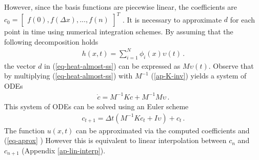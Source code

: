 However, since the basis functions are piecewise linear, the coefficients are \(c_0 = \begin{bmatrix}
f(0), f(\Delta x), ..., f(n)
\end{bmatrix}^T\)
\cite{Gustafsson2011g}.
It is necessary to approximate \(d\) for each point in time using numerical integration schemes.
By assuming that the following decomposition holds
\begin{gather}
h(x, t) = \sum_{i = 1}^{N} \phi_i(x) \upsilon(t) \,.
\end{gather}
the vector \(d\) in (\ref{eq-heat-almost-ss}) can be expressed as \(M\upsilon(t)\).
Observe that by multiplying (\ref{eq-heat-almost-ss}) with \(M^{-1}\) (\ref{ap-K-inv}) yields a system of ODEs
\begin{gather}
\dot{c} = M^{-1}Kc + M^{-1}M\upsilon \,. \label{almost-almost-ss}
\end{gather}
This system of ODEs can be solved using an Euler scheme
\begin{gather}
c_{t+1} = \Delta t (M^{-1}Kc_{t} + I\upsilon) + c_{t} \,. \label{fem-euler}
\end{gather}
 The function \(u(x,t)\) can be approximated via the computed coefficients and  (\ref{eq-aprox} )
However this is equivalent to linear interpolation between \(c_{n}\) and \(c_{n+1}\) (Appendix \ref{ap-lin-interp}).


